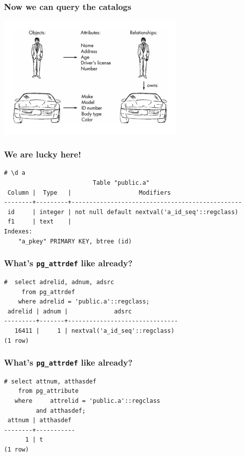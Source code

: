 \documentclass{beamer}
\begin{document}
\begin{frame}[fragile]
  \frametitle{Now we can query the catalogs}

  \vfill
  
  \begin{center}
    \includegraphics[height=2.4in]{relation-attributes.jpg}
  \end{center}
\end{frame}

\begin{frame}[fragile]
  \frametitle{We are lucky here!}

  \vfill

  \begin{verbatim}
# \d a
                         Table "public.a"
 Column |  Type   |                   Modifiers                    
--------+---------+------------------------------------------------
 id     | integer | not null default nextval('a_id_seq'::regclass)
 f1     | text    | 
Indexes:
    "a_pkey" PRIMARY KEY, btree (id)
  \end{verbatim}
\end{frame}

\begin{frame}[fragile]
  \frametitle{What's \texttt{pg\_attrdef} like already?}

  \begin{verbatim}
#  select adrelid, adnum, adsrc
     from pg_attrdef
    where adrelid = 'public.a'::regclass;
 adrelid | adnum |             adsrc             
---------+-------+-------------------------------
   16411 |     1 | nextval('a_id_seq'::regclass)
(1 row)
  \end{verbatim}
\end{frame}

\begin{frame}[fragile]
  \frametitle{What's \texttt{pg\_attrdef} like already?}

  \begin{verbatim}
# select attnum, atthasdef
    from pg_attribute
   where     attrelid = 'public.a'::regclass
         and atthasdef;
 attnum | atthasdef 
--------+-----------
      1 | t
(1 row)
  \end{verbatim}
\end{frame}
\end{document}
